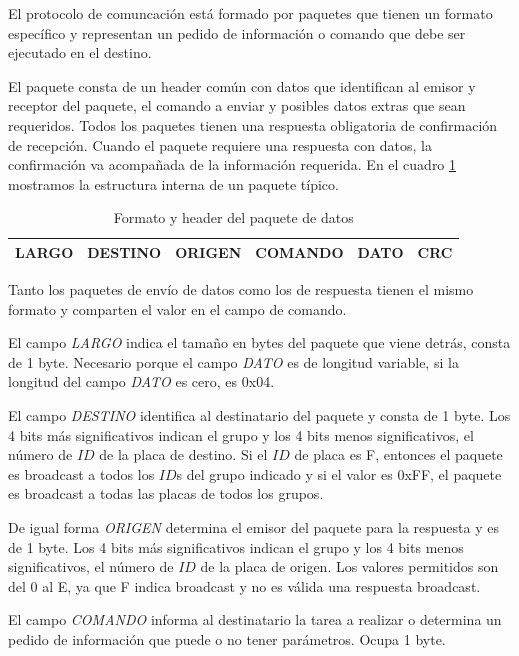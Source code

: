 El protocolo de comuncaci\'on est\'a formado por paquetes que tienen un formato espec\'ifico y representan un pedido de
informaci\'on o comando que debe ser ejecutado en el destino.

El paquete consta de un header com\'un con datos que identifican al emisor y receptor del paquete, el comando a enviar y
posibles datos extras que sean requeridos.
Todos los paquetes tienen una respuesta obligatoria de confirmaci\'on de recepci\'on.
Cuando el paquete requiere una respuesta con datos, la confirmaci\'on va acompa\~nada de la informaci\'on requerida.
En el cuadro \ref{hF_comm_paquete_tabla} mostramos la estructura interna de un paquete t\'ipico.

\begin{table}[ht]
	\begin{center}
		\begin{tabular}{|c|c|c|c|c|c|}
			\hline
			LARGO & DESTINO & ORIGEN & COMANDO & DATO & CRC \\
			\hline
		\end{tabular}
	\caption{Formato y header del paquete de datos}
	\label{hF_comm_paquete_tabla}
	\end{center}
\end{table}

Tanto los paquetes de env\'io de datos como los de respuesta tienen el mismo formato y comparten el valor en el campo de comando.

El campo \emph{LARGO} indica el tama\~no en bytes del paquete que viene detr\'as, consta de 1 byte.
Necesario porque el campo \emph{DATO} es de longitud variable, si la longitud del campo \emph{DATO} es cero, es 0x04.

El campo \emph{DESTINO} identifica al destinatario del paquete y consta de 1 byte.
Los 4 bits m\'as significativos indican el grupo y los 4 bits menos significativos, el n\'umero de $ID$ de la placa de destino.
Si el $ID$ de placa es F, entonces el paquete es broadcast a todos los $ID$s del grupo indicado y si el valor es 0xFF, el paquete
es broadcast a todas las placas de todos los grupos.

De igual forma \emph{ORIGEN} determina el emisor del paquete para la respuesta y es de 1 byte.
Los 4 bits m\'as significativos indican el grupo y los 4 bits menos significativos, el n\'umero de $ID$ de la placa de origen.
Los valores permitidos son del $0$ al E, ya que F indica broadcast y no es v\'alida una respuesta broadcast.

El campo \emph{COMANDO} informa al destinatario la tarea a realizar o determina un pedido de informaci\'on que puede o no
tener par\'ametros.
Ocupa 1 byte.


